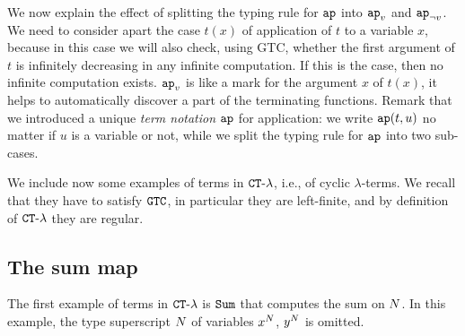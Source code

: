\begin{remark}
  We now explain the effect of splitting the typing rule for ${\tt ap}$ into 
  $\apvar$ and $\apnotvar$.
We need to consider apart the case $t(x)$ of application of $t$ to a variable
$x$, because in this case we will also check, using GTC, 
whether the first argument of $t$ is infinitely decreasing in any infinite 
computation. If this is the case, then no infinite computation exists. $\apvar$ is like 
a mark  for the argument $x$ of $t(x)$,
it helps to automatically discover a part of the terminating functions.
Remark that we introduced a unique \emph{term notation ${\tt ap}$} for application: 
we write ${\tt ap}(t,u)$ no matter if $u$ is a variable or not, while we split 
the typing rule for ${\tt ap}$ into two sub-cases. 
\end{remark}

We include now some examples of  terms in ${ {\tt CT}\mbox{-}\lambda}$, i.e., 
of cyclic $\lambda$-terms. We recall that they have to satisfy ${\tt GTC}$, 
in particular they are left-finite, and by definition of ${ {\tt CT}\mbox{-}\lambda}$ they are regular.





\subsection{The sum map}

The first example of terms in ${ {\tt CT}\mbox{-}\lambda}$ is ${\tt Sum}$ that computes the sum on ${N}$. 
In this example, the type superscript ${N}$ of variables $x^{N}$, $y^{N}$ is omitted.

